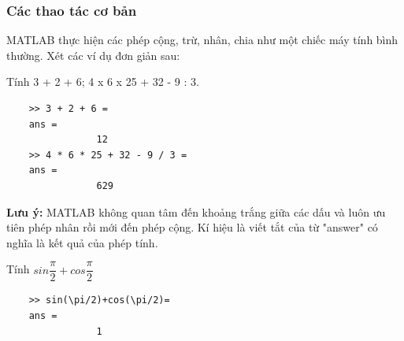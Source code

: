 \documentclass[12pt,a4paper]{article}
\begin{document}
\subsubsection{Các thao tác cơ bản}
MATLAB thực hiện các phép cộng, trừ, nhân, chia như một chiếc máy tính bình thường. Xét các ví dụ đơn giản sau:\\
\begin{example}
	Tính 3 + 2 + 6; 4 x 6 x 25 + 32 - 9 : 3.
	\begin{lstlisting}
	>> 3 + 2 + 6 =
	ans =
				12
	>> 4 * 6 * 25 + 32 - 9 / 3 =
	ans =
				629
	\end{lstlisting}
\end{example}

\textbf{Lưu ý:} MATLAB không quan tâm đến khoảng trắng giữa các dấu và luôn ưu tiên phép nhân rồi mới đến phép cộng. Kí hiệu  là viết tắt của từ "answer" có nghĩa là kết quả của phép tính.\\
\begin{example}
	Tính $sin{\dfrac{\pi}{2}}+cos{\dfrac{\pi}{2}}$\\
	\begin{lstlisting}
	>> sin(\pi/2)+cos(\pi/2)=
	ans =
				1
	\end{lstlisting}
\end{example}
\end{document}
